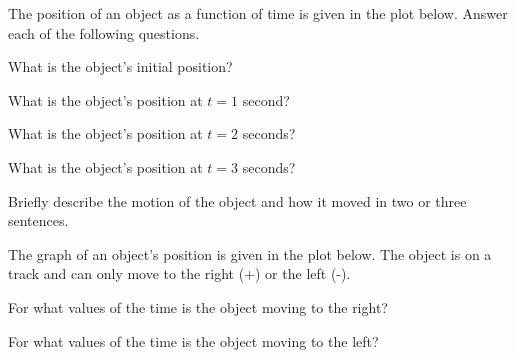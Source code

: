 


\begin{problem}
\item The position of an object as a function of time is given in the plot
  below. Answer each of the following questions.

  \scalebox{0.5}{}

  \begin{subproblem}
  \item What is the object's initial position?
    \vfill

  \item What is the object's position at $t=1$ second?
    \vfill

  \item What is the object's position at $t=2$ seconds?
    \vfill

  \item What is the object's position at $t=3$ seconds?
    \vfill

  \item Briefly describe the motion of the object and how it moved in
    two or three sentences.
    \vfill
    \vfill

  \end{subproblem}

  \clearpage

\item The graph of an object's position is given in the plot
  below. The object is on a track and can only move to the right (+)
  or the left (-).

  \scalebox{0.4}{}

  \begin{subproblem}
    \item For what values of the time is the object moving to the
      right?
      \vfill
    \item For what values of the time is the object moving to the
      left?
      \vfill
  \end{subproblem}


\end{problem}

